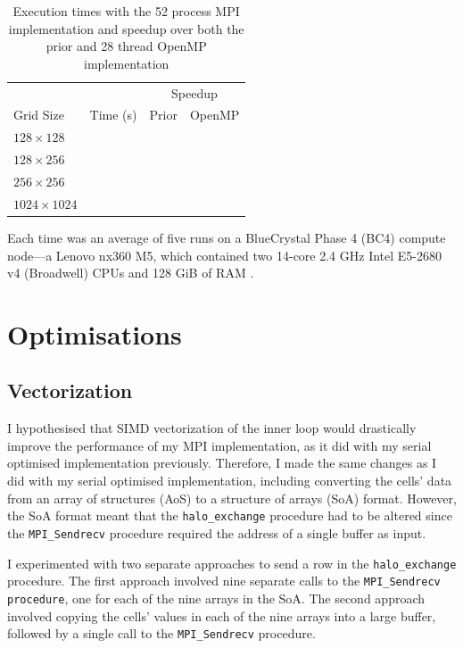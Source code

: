 \documentclass[twocolumn, a4paper]{article}
\begin{document}
\begin{table}[htbp]
  \begin{center}
  \caption{Execution times with the 52 process MPI implementation and speedup over both the prior and 28 thread OpenMP implementation}\label{tab:mpi}
  \begin{tabular}[t]{l | l  l  l} 
      \hline\hline
      &&\multicolumn{2}{c}{Speedup}\\
      \cline{3-4}
      Grid Size&Time (s)&Prior&OpenMP\\
      \hline
      $128 \times 128$&\texttt{}&\texttt{}&\texttt{}\\
      $128 \times 256$&\texttt{}&\texttt{}&\texttt{}\\
      $256 \times 256$&\texttt{}&\texttt{}&\texttt{}\\
      $1024 \times 1024$&\texttt{}&\texttt{}&\texttt{}\\
      \hline
    \end{tabular}
  \end{center}
\end{table}

Each time was an average of five runs on a BlueCrystal Phase 4 (BC4) compute node---a Lenovo nx360 M5, which contained two 14-core 2.4 GHz Intel E5-2680 v4 (Broadwell) CPUs and 128 GiB of RAM \cite{bcp4}.

\section{Optimisations}

\subsection{Vectorization}

I hypothesised that SIMD vectorization of the inner loop would drastically improve the performance of my MPI implementation, as it did with my serial optimised implementation previously.
Therefore, I made the same changes as I did with my serial optimised implementation, including converting the cells' data from an array of structures (AoS) to a structure of arrays (SoA) format.
However, the SoA format meant that the \texttt{halo\_exchange} procedure had to be altered since the \texttt{MPI\_Sendrecv} procedure required the address of a single buffer as input.

I experimented with two separate approaches to send a row in the \texttt{halo\_exchange} procedure.
The first approach involved nine separate calls to the \texttt{MPI\_Sendrecv procedure}, one for each of the nine arrays in the SoA.
The second approach involved copying the cells' values in each of the nine arrays into a large buffer, followed by a single call to the \texttt{MPI\_Sendrecv} procedure.
\end{document}

